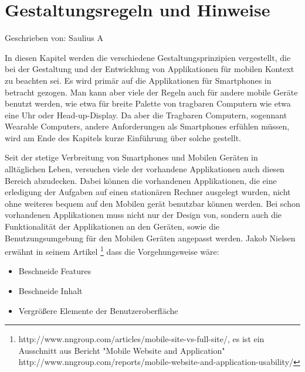 
\section{Gestaltungsregeln und Hinweise}

Geschrieben von: Saulius A

In diesen Kapitel werden die verschiedene Gestaltungsprinzipien vergestellt, die bei der Gestaltung und der Entwicklung von Applikationen für mobilen Kontext zu beachten sei. Es wird primär auf die Applikationen für Smartphones in betracht gezogen. Man kann aber viele der Regeln auch für andere mobile Geräte benutzt werden, wie etwa für breite Palette von tragbaren Computern wie etwa eine Uhr oder Head-up-Display. Da aber die Tragbaren Computern, sogennant Wearable Computers, andere Anforderungen als Smartphones erfühlen müssen, wird am Ende des Kapitels kurze Einführung über solche gestellt.


Seit der stetige Verbreitung von Smartphones und Mobilen Geräten in alltäglichen Leben, versuchen viele der vorhandene Applikationen auch diesen Bereich abzudecken. Dabei können die vorhandenen Applikationen, die eine erledigung der Aufgaben auf einen stationären Rechner ausgelegt wurden, nicht ohne weiteres bequem auf den Mobilen gerät benutzbar können werden. Bei schon vorhandenen Applikationen muss nicht nur der Design von, sondern auch die Funktionalität der Applikationen an den Geräten, sowie die Benutzungsumgebung für den Mobilen Geräten angepasst werden. Jakob Nielsen erwähnt in seinem Artikel \footnote{http://www.nngroup.com/articles/mobile-site-vs-full-site/, es ist ein Ausschnitt aus Bericht "Mobile Website and Application" http://www.nngroup.com/reports/mobile-website-and-application-usability/} dass die Vorgehungsweise wäre:

\begin{itemize}
	\item Beschneide Features
	\item Beschneide Inhalt
	\item Vergrößere Elemente der Benutzeroberfläche
\end{itemize}

